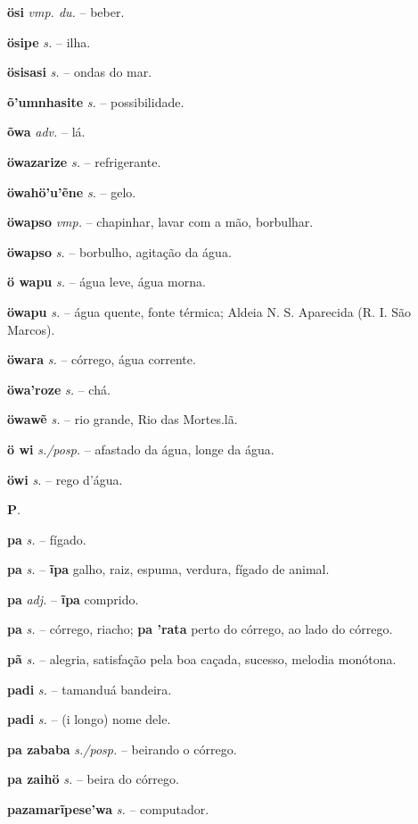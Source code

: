 \textbf{ösi} \textit{vmp. du.} -- beber.

\textbf{ösipe} \textit{s.} -- ilha.

\textbf{ösisasi} \textit{s.} -- ondas do mar.

\textbf{õ'umnhasite} \textit{s.} -- possibilidade.

\textbf{õwa} \textit{adv.} -- lá.

\textbf{öwazarize} \textit{s.} -- refrigerante.

\textbf{öwahö'u'ẽne} \textit{s.} -- gelo.

\textbf{öwapso} \textit{vmp.} -- chapinhar, lavar com a mão, borbulhar.

\textbf{öwapso} \textit{s.} -- borbulho, agitação da água.

\textbf{ö wapu} \textit{s.} -- água leve, água morna.

\textbf{öwapu} \textit{s.} -- água quente, fonte térmica; Aldeia N. S. Aparecida (R. I. São Marcos).

\textbf{öwara} \textit{s.} -- córrego, água corrente.

\textbf{öwa'roze} \textit{s.} -- chá.

\textbf{öwawẽ} \textit{s.} -- rio grande, Rio das Mortes.lã.

\textbf{ö wi} \textit{s./posp.} -- afastado da água, longe da água.

\textbf{öwi} \textit{s.} -- rego d'água.



\textbf{P}.



\textbf{pa} \textit{s.} -- fígado.

\textbf{pa} \textit{s.} -- \textbf{ĩpa} galho, raiz, espuma, verdura, fígado de animal.

\textbf{pa} \textit{adj.} -- \textbf{ĩpa} comprido.

\textbf{pa} \textit{s.} -- córrego, riacho; \textbf{pa 'rata} perto do córrego, ao lado do córrego.

\textbf{pã} \textit{s.} -- alegria, satisfação pela boa caçada, sucesso, melodia monótona.

\textbf{padi} \textit{s.} -- tamanduá bandeira.

\textbf{padi} \textit{s.} -- (i longo) nome dele.

\textbf{pa zababa} \textit{s./posp.} -- beirando o córrego.

\textbf{pa zaihö} \textit{s.} -- beira do córrego.

\textbf{pazamarĩpese'wa} \textit{s.} -- computador.

